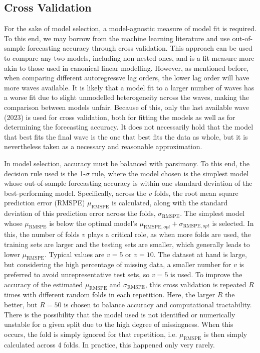 \subsection{Cross Validation}
\label{sec:methods:cv}
For the sake of model selection, a model-agnostic measure of model fit is required. To this end, we may borrow from the
machine learning literature and use out-of-sample forecasting accuracy through cross validation.
This approach can be used to compare any two models, including non-nested ones, and is a fit measure more akin to those
used in canonical linear modelling.
However, as mentioned before, when comparing different autoregressve lag orders, the lower lag order will have
more waves available. It is likely that a model fit to a larger number of waves has a worse fit due to slight
unmodelled heterogeneity across the waves, making the comparison between models unfair. Because of this, only the last
available wave (2023) is used for cross validation, both for fitting the models as well as for determining the forecasting
accuracy. It does not necessarily hold that the model that best fits the final wave is the one that best fits
the data as whole, but it is nevertheless taken as a necessary and reasonable approximation.

In model selection, accuracy must be balanced with parsimony. To this end, the decision rule used is the 1-$\sigma$ rule,
where the model chosen is the simplest model whose out-of-sample forecasting accuracy is within one standard deviation
of the best-performing model. Specifically, across the $v$ folds, the root mean square prediction error (RMSPE)
$\mu_{\text{RMSPE}}$ is calculated, along with the standard deviation of this prediction error across the folds,
$\sigma_{\text{RMSPE}}$. The simplest model whose $\mu_{\text{RMSPE}}$ is below the optimal model's
$\mu_{\text{RMSPE},opt} + \sigma_{\text{RMSPE},opt}$ is selected.
In this, the number of folds $v$ plays a critical role, as when more folds are used, the training sets are larger
and the testing sets are smaller, which generally leads to lower $\mu_{\text{RMSPE}}$. Typical values are $v = 5$ or
$v = 10$. The dataset at hand is large, but considering the high percentage of missing data, a smaller number for
$v$ is preferred to avoid unrepresentative test sets, so $v = 5$ is used.
To improve the accuracy of the estimated $\mu_{\text{RMSPE}}$ and $\sigma_{\text{RMSPE}}$, this cross validation
is repeated $R$ times with different random folds in each repetition. Here, the larger $R$ the better, but $R = 50$
is chosen to balance accuracy and computational tractability.
There is the possibility that the model used is not identified or numerically unstable for a given split due to the high
degree of missingness. When this occurs, the fold is simply ignored for that repetition, i.e. $\mu_{\text{RMSPE}}$ is then
simply calculated across 4 folds. In practice, this happened only very rarely.

